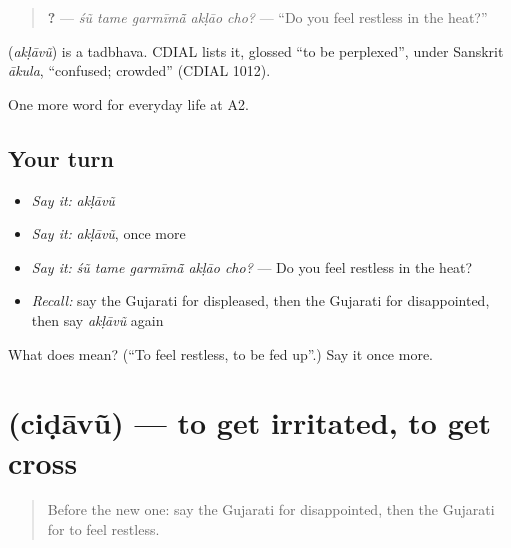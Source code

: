 \begin{quote}
\textbf{    ?} — \emph{śũ tame garmīmā̃ akḷāo cho?} — \textquotedblleft{}Do you feel restless in the heat?\textquotedblright{}
\end{quote}

\begin{cousinweb}
\textbf{} (\emph{akḷāvũ}) is a tadbhava. CDIAL lists it, glossed \textquotedblleft{}to be perplexed\textquotedblright{}, under Sanskrit \emph{ākula}, \textquotedblleft{}confused; crowded\textquotedblright{} (CDIAL 1012).
\end{cousinweb}

\begin{grammarlens}[title={What you've built}]
One more word for everyday life at A2.
\end{grammarlens}

\subsection*{Your turn}
\begin{itemize}
\raggedright
  \item \emph{Say it:} \emph{akḷāvũ}
  \item \emph{Say it:} \emph{akḷāvũ}, once more
  \item \emph{Say it:} \emph{śũ tame garmīmā̃ akḷāo cho?} — Do you feel restless in the heat?
  \item \emph{Recall:} say the Gujarati for displeased, then the Gujarati for disappointed, then say \emph{akḷāvũ} again
\end{itemize}

\begin{tcolorbox}[breakable,colback=teal!4,colframe=teal!35!black,title={Before you move on}]
What does  mean? (\textquotedblleft{}To feel restless, to be fed up\textquotedblright{}.) Say it once more.
\end{tcolorbox}
\section[\texorpdfstring{\gu{ચિડાવું} (ciḍāvũ)}{ચિડાવું (ciḍāvũ)}]{ (ciḍāvũ) — to get irritated, to get cross}

\label{lesson:GU-C267-cidavu}



\begin{quote}
Before the new one: say the Gujarati for disappointed, then the Gujarati for to feel restless.
\end{quote}


